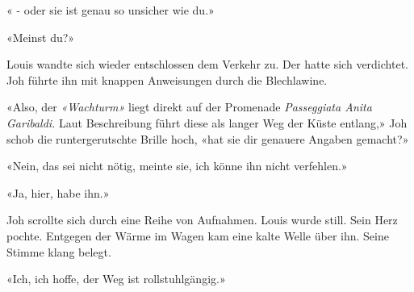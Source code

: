 « - oder sie ist genau so unsicher wie du.»

«Meinst du?»

Louis wandte sich wieder entschlossen dem Verkehr zu. Der hatte sich
verdichtet. Joh führte ihn mit knappen Anweisungen durch die
Blechlawine.

«Also, der \emph{«Wachturm»} liegt direkt auf der Promenade
\emph{Passeggiata Anita Garibaldi.} Laut Beschreibung führt diese als langer
Weg der Küste entlang,» Joh schob die runtergerutschte Brille hoch, «hat
sie dir genauere Angaben gemacht?»

«Nein, das sei nicht nötig, meinte sie, ich könne ihn nicht verfehlen.»

«Ja, hier, habe ihn.»

Joh scrollte sich durch eine Reihe von Aufnahmen.
Louis wurde still. Sein Herz pochte. Entgegen der 
Wärme im Wagen kam eine kalte Welle über ihn. Seine Stimme klang
belegt.

«Ich, ich hoffe, der Weg ist rollstuhlgängig.»
